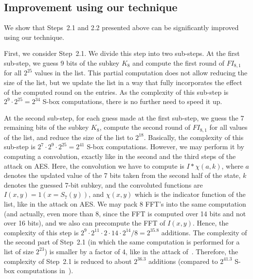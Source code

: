 \subsection{Improvement using our technique} 

We show that Steps~2.1 and 2.2 presented above can be significantly improved using our technique.

First, we consider Step~2.1. We divide this step into two sub-steps. At the first sub-step, we guess 9 bits of the subkey $K_8$ and compute the first round of $FI_{8,1}$ for all $2^{25}$ values in the list. This partial computation does not allow reducing the size of the list, but we update the list in a way that fully incorporates the effect of the computed round on the entries. As the complexity of this sub-step is $2^9 \cdot 2^{25}=2^{34}$ S-box computations, there is no further need to speed it up. 

At the second sub-step, for each guess made at the first sub-step, we guess the 7 remaining bits of the subkey $K_8$, compute the second round of $FI_{8,1}$ for all values of the list, and reduce the size of the list to $2^{18}$. Basically, the complexity of this sub-step is $2^{7} \cdot 2^9 \cdot 2^{25}=2^{41}$ S-box computations. However, we may perform it by computing a convolution, exactly like in the second and the third steps of the attack on AES. Here, the convolution we have to compute is $I*\chi(a,k)$, where $a$ denotes the updated value of the 7 bits taken from the second half of the state, $k$ denotes the guessed 7-bit subkey, and the convoluted functions are $I(x,y)=1(x=S_7(y))$, and $\chi(x,y)$ which is the indicator function of the list, like in the attack on AES. We may pack 8 FFT's into the same computation (and actually, even more than 8, since the FFT is computed over 14 bits and not over 16 bits), and we also can precompute the FFT of $I(x,y)$. Hence, the complexity of this step is $2^{9} \cdot 2^{11} \cdot 2 \cdot 14 \cdot 2^{14}/8 = 2^{35.8}$ additions. The complexity of the second part of Step~2.1 (in which the same computation is performed for a list of size $2^{23}$) is smaller by a factor of 4, like in the attack of~\cite{C:BarKel16}. Therefore, the complexity of Step~2.1 is reduced to about $2^{36.3}$ additions (compared to $2^{41.3}$ S-box computations in~\cite{C:BarKel16}).

